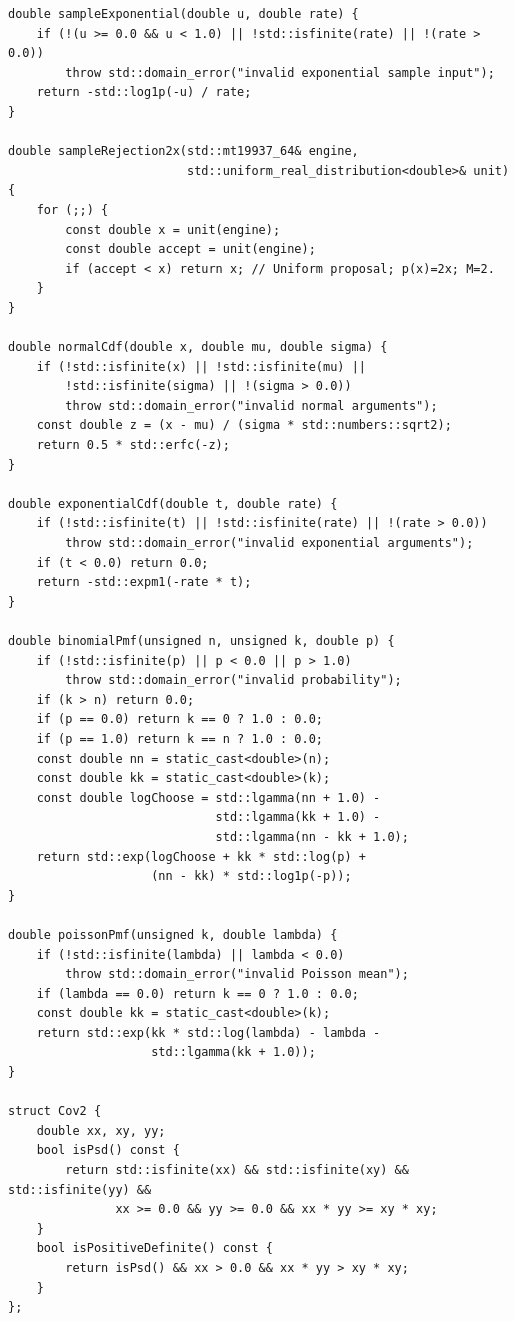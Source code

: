 \begin{verbatim}
double sampleExponential(double u, double rate) {
    if (!(u >= 0.0 && u < 1.0) || !std::isfinite(rate) || !(rate > 0.0))
        throw std::domain_error("invalid exponential sample input");
    return -std::log1p(-u) / rate;
}

double sampleRejection2x(std::mt19937_64& engine,
                         std::uniform_real_distribution<double>& unit) {
    for (;;) {
        const double x = unit(engine);
        const double accept = unit(engine);
        if (accept < x) return x; // Uniform proposal; p(x)=2x; M=2.
    }
}

double normalCdf(double x, double mu, double sigma) {
    if (!std::isfinite(x) || !std::isfinite(mu) ||
        !std::isfinite(sigma) || !(sigma > 0.0))
        throw std::domain_error("invalid normal arguments");
    const double z = (x - mu) / (sigma * std::numbers::sqrt2);
    return 0.5 * std::erfc(-z);
}

double exponentialCdf(double t, double rate) {
    if (!std::isfinite(t) || !std::isfinite(rate) || !(rate > 0.0))
        throw std::domain_error("invalid exponential arguments");
    if (t < 0.0) return 0.0;
    return -std::expm1(-rate * t);
}

double binomialPmf(unsigned n, unsigned k, double p) {
    if (!std::isfinite(p) || p < 0.0 || p > 1.0)
        throw std::domain_error("invalid probability");
    if (k > n) return 0.0;
    if (p == 0.0) return k == 0 ? 1.0 : 0.0;
    if (p == 1.0) return k == n ? 1.0 : 0.0;
    const double nn = static_cast<double>(n);
    const double kk = static_cast<double>(k);
    const double logChoose = std::lgamma(nn + 1.0) -
                             std::lgamma(kk + 1.0) -
                             std::lgamma(nn - kk + 1.0);
    return std::exp(logChoose + kk * std::log(p) +
                    (nn - kk) * std::log1p(-p));
}

double poissonPmf(unsigned k, double lambda) {
    if (!std::isfinite(lambda) || lambda < 0.0)
        throw std::domain_error("invalid Poisson mean");
    if (lambda == 0.0) return k == 0 ? 1.0 : 0.0;
    const double kk = static_cast<double>(k);
    return std::exp(kk * std::log(lambda) - lambda -
                    std::lgamma(kk + 1.0));
}

struct Cov2 {
    double xx, xy, yy;
    bool isPsd() const {
        return std::isfinite(xx) && std::isfinite(xy) && std::isfinite(yy) &&
               xx >= 0.0 && yy >= 0.0 && xx * yy >= xy * xy;
    }
    bool isPositiveDefinite() const {
        return isPsd() && xx > 0.0 && xx * yy > xy * xy;
    }
};


\end{verbatim}
